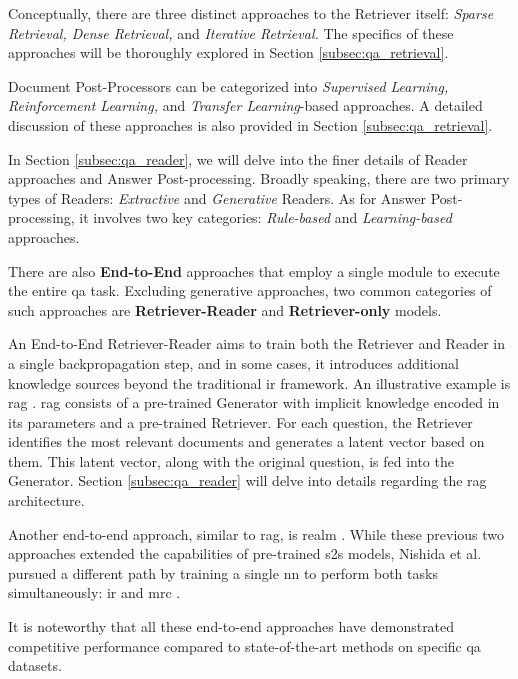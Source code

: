 Conceptually, there are three distinct approaches to the Retriever itself: \textit{Sparse Retrieval, Dense Retrieval,} and \textit{Iterative Retrieval.} The specifics of these approaches will be thoroughly explored in Section \ref{subsec:qa_retrieval}.

Document Post-Processors can be categorized into \textit{Supervised Learning, Reinforcement Learning,} and \textit{Transfer Learning}-based approaches. A detailed discussion of these approaches is also provided in Section \ref{subsec:qa_retrieval}.

In Section \ref{subsec:qa_reader}, we will delve into the finer details of Reader approaches and Answer Post-processing. Broadly speaking, there are two primary types of Readers: \textit{Extractive} and \textit{Generative} Readers. As for Answer Post-processing, it involves two key categories: \textit{Rule-based} and \textit{Learning-based} approaches.

There are also \textbf{End-to-End} approaches that employ a single module to execute the entire \gls{qa} task. Excluding generative approaches, two common categories of such approaches are \textbf{Retriever-Reader} and \textbf{Retriever-only} models.

An End-to-End Retriever-Reader aims to train both the Retriever and Reader in a single backpropagation step, and in some cases, it introduces additional knowledge sources beyond the traditional \gls{ir} framework. An illustrative example is \gls{rag} \cite{lewis_retrieval-augmented_2021}. \gls{rag} consists of a pre-trained Generator with implicit knowledge encoded in its parameters and a pre-trained Retriever. For each question, the Retriever identifies the most relevant documents and generates a latent vector based on them. This latent vector, along with the original question, is fed into the Generator. Section \ref{subsec:qa_reader} will delve into details regarding the \gls{rag} architecture.

Another end-to-end approach, similar to \gls{rag}, is \gls{realm} \cite{guu_realm_2020}. While these previous two approaches extended the capabilities of pre-trained \gls{s2s} models, Nishida et al. pursued a different path by training a single \gls{nn} to perform both tasks simultaneously: \gls{ir} and \gls{mrc} \cite{nishida_retrieve-and-read_2018}.

It is noteworthy that all these end-to-end approaches have demonstrated competitive performance compared to state-of-the-art methods on specific \gls{qa} datasets.

